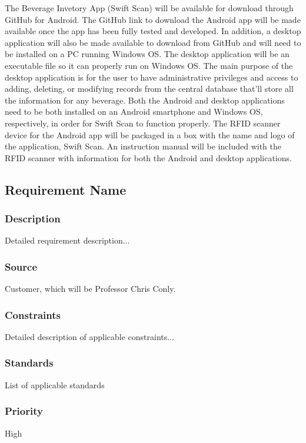 The Beverage Invetory App (Swift Scan) will be available for download through GitHub for Android.  The GitHub link to download the Android app will be made available once the app has been fully tested and developed.  In addition, a desktop application will also be made available to download from GitHub and will need to be installed on a PC running Windows OS.  The desktop application will be an executable file so it can properly run on Windows OS.  The main purpose of the desktop application is for the user to have administrative privileges and access to adding, deleting, or modifying records from the central database that'll store all the information for any beverage.  Both the Android and desktop applications need to be both installed on an Android smartphone and Windows OS, respectively, in order for Swift Scan to function properly.  The RFID scanner device for the Android app will be packaged in a box with the name and logo of the application, Swift Scan.  An instruction manual will be included with the RFID scanner with information for both the Android and desktop applications.

\subsection{Requirement Name}
\subsubsection{Description}
Detailed requirement description...
\subsubsection{Source}
Customer, which will be Professor Chris Conly.
\subsubsection{Constraints}
Detailed description of applicable constraints...
\subsubsection{Standards}
List of applicable standards
\subsubsection{Priority}
High
